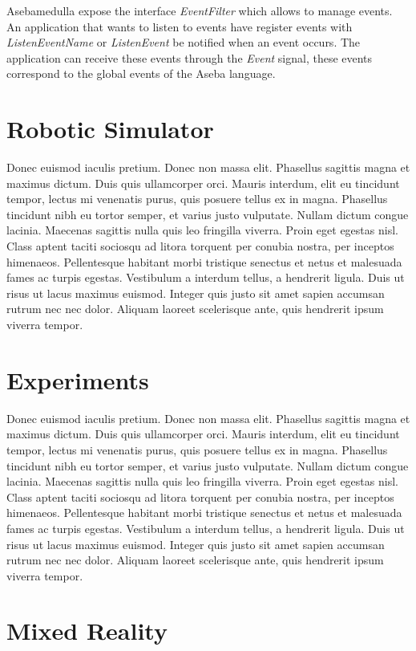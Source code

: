 \documentclass[format=acmsmall, review=false, screen=true]{acmart}
\begin{document}
Asebamedulla expose the interface \emph{EventFilter} which allows to manage events. An application that wants to listen to events have register events with \emph{ListenEventName} or \emph{ListenEvent} be notified when an event occurs. The application can receive these events through the \emph{Event} signal, these events correspond to the global events of the Aseba language.

\section{Robotic Simulator}

Donec euismod iaculis pretium. Donec non massa elit. Phasellus sagittis magna et maximus dictum. Duis quis ullamcorper orci. Mauris interdum, elit eu tincidunt tempor, lectus mi venenatis purus, quis posuere tellus ex in magna. Phasellus tincidunt nibh eu tortor semper, et varius justo vulputate. Nullam dictum congue lacinia. Maecenas sagittis nulla quis leo fringilla viverra. Proin eget egestas nisl. Class aptent taciti sociosqu ad litora torquent per conubia nostra, per inceptos himenaeos. Pellentesque habitant morbi tristique senectus et netus et malesuada fames ac turpis egestas. Vestibulum a interdum tellus, a hendrerit ligula. Duis ut risus ut lacus maximus euismod. Integer quis justo sit amet sapien accumsan rutrum nec nec dolor. Aliquam laoreet scelerisque ante, quis hendrerit ipsum viverra tempor.

\section{Experiments}

Donec euismod iaculis pretium. Donec non massa elit. Phasellus sagittis magna et maximus dictum. Duis quis ullamcorper orci. Mauris interdum, elit eu tincidunt tempor, lectus mi venenatis purus, quis posuere tellus ex in magna. Phasellus tincidunt nibh eu tortor semper, et varius justo vulputate. Nullam dictum congue lacinia. Maecenas sagittis nulla quis leo fringilla viverra. Proin eget egestas nisl. Class aptent taciti sociosqu ad litora torquent per conubia nostra, per inceptos himenaeos. Pellentesque habitant morbi tristique senectus et netus et malesuada fames ac turpis egestas. Vestibulum a interdum tellus, a hendrerit ligula. Duis ut risus ut lacus maximus euismod. Integer quis justo sit amet sapien accumsan rutrum nec nec dolor. Aliquam laoreet scelerisque ante, quis hendrerit ipsum viverra tempor.

\section{Mixed Reality}
\end{document}
